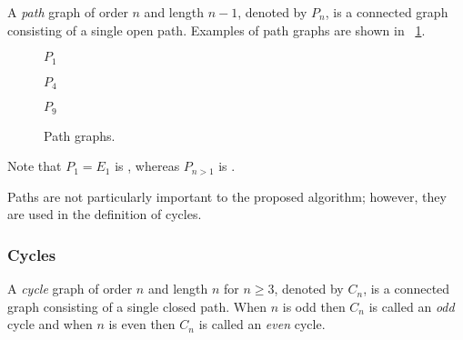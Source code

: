 A \emph{path} graph of order \(n\) and length \(n-1\), denoted by \(P_n\), is a connected graph consisting of a
single open path.  Examples of path graphs are shown in \figurename~\ref{fig:path}.

\begin{figure}[H]
  \begin{minipage}{1in}
    \centering

    \bigskip

    \(P_1\)
  \end{minipage}
  \begin{minipage}{2.5in}
    \centering

    \bigskip

    \(P_4\)
  \end{minipage}
  \begin{minipage}{2in}
    \centering

    \bigskip

    \(P_9\)
  \end{minipage}
  \caption{Path graphs.}
  \label{fig:path}
\end{figure}

Note that \(P_1=E_1\) is , whereas \(P_{n>1}\) is .

Paths are not particularly important to the proposed algorithm; however, they are used in the definition of cycles.

\subsubsection{Cycles}\label{sec:sub:sub:cycles}

A \emph{cycle} graph of order \(n\) and length \(n\) for \(n\ge3\), denoted by \(C_n\), is a connected graph
consisting of a single closed path.  When \(n\) is odd then \(C_n\) is called an \emph{odd} cycle and when \(n\) is
even then \(C_n\) is called an \emph{even} cycle.

